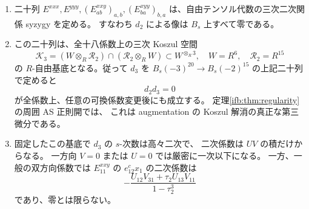 \begin{theorem}
\begin{enumerate}
\item 二十列
$E^{xxx},E^{yyy},(E^{xxy}_{ab})_{a,b},(E^{xyy}_{ba})_{b,a}$
は、自由テンソル代数の三次二次関係 syzygy を定める。
すなわち $d_2$ による像は $B_s$ 上すべて零である。
\item この二十列は、全十八係数上の三次 Koszul 空間
\[
 \mathcal K_3=(W\otimes_R\mathcal R_2)
                      \cap(\mathcal R_2\otimes_RW)
                     \subset W^{\otimes_R3},
 \quad W=R^6,\quad \mathcal R_2=R^{15}
\]
の $R$-自由基底となる。従って $d_3$ を
$B_s(-3)^{20}\to B_s(-2)^{15}$ の上記二十列で定めると
\begin{equation}\label{ifj:eq:mixed-d3-complete}
                  d_2d_3=0
\end{equation}
が全係数上、任意の可換係数変更後にも成立する。
定理\ref{ifb:thm:regularity}の周囲 AS 正則開では、
これは augmentation の Koszul 解消の真正な第三微分である。
\item 固定したこの基底で $d_3$ の $s$-次数は高々二次で、
二次係数は $UV$ の積だけからなる。
一方向 $V=0$ または $U=0$ では厳密に一次以下になる。
一方、一般の双方向係数では $E^{xxy}_{11}$ の
$e_{12}^c x_1$ の二次係数は
\begin{equation}\label{ifj:eq:mixed-d3-quadratic-witness}
 -\frac{U_{12}V_{31}+\tau_2U_{13}V_{11}}{1-\tau_2^3}
\end{equation}
であり、零とは限らない。
\end{enumerate}
\end{theorem}

